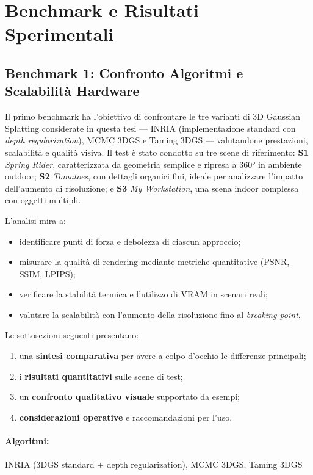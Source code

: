 \section{Benchmark e Risultati Sperimentali}
\label{sec:benchmark_risultati}

\subsection{Benchmark 1: Confronto Algoritmi e Scalabilità Hardware}
\label{subsec:benchmark1_sintetico}

Il primo benchmark ha l’obiettivo di confrontare le tre varianti di 3D Gaussian Splatting considerate in questa tesi — INRIA (implementazione standard con \textit{depth regularization}), MCMC 3DGS e Taming 3DGS — valutandone prestazioni, scalabilità e qualità visiva. 
Il test è stato condotto su tre scene di riferimento: \textbf{S1} \textit{Spring Rider}, caratterizzata da geometria semplice e ripresa a 360° in ambiente outdoor; \textbf{S2} \textit{Tomatoes}, con dettagli organici fini, ideale per analizzare l’impatto dell’aumento di risoluzione; e \textbf{S3} \textit{My Workstation}, una scena indoor complessa con oggetti multipli.

L’analisi mira a:
\begin{itemize}
	\item identificare punti di forza e debolezza di ciascun approccio;
	\item misurare la qualità di rendering mediante metriche quantitative (PSNR, SSIM, LPIPS);
	\item verificare la stabilità termica e l’utilizzo di VRAM in scenari reali;
	\item valutare la scalabilità con l’aumento della risoluzione fino al \textit{breaking point}.
\end{itemize}

Le sottosezioni seguenti presentano:
\begin{enumerate}
	\item una \textbf{sintesi comparativa} per avere a colpo d’occhio le differenze principali;
	\item i \textbf{risultati quantitativi} sulle scene di test;
	\item un \textbf{confronto qualitativo visuale} supportato da esempi;
	\item \textbf{considerazioni operative} e raccomandazioni per l’uso.
\end{enumerate}


\paragraph{Algoritmi:} INRIA (3DGS standard + depth regularization), MCMC 3DGS, Taming 3DGS \\

